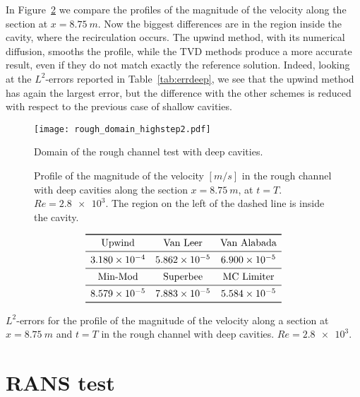 In Figure~\ref{fig:linecompdeep} we compare the profiles of the magnitude of 
the velocity along the section at $x=\SI{8.75}{m}$. Now the biggest differences 
are in the region inside the cavity, where the recirculation occurs. The upwind 
method, with its numerical diffusion, smooths the profile, while the TVD 
methods produce a more accurate result, even if they do not match exactly the 
reference solution. Indeed, looking at the $L^2$-errors reported in 
Table~\ref{tab:errdeep}, we see that the upwind method has again the largest error, 
but the difference with the other schemes is reduced with respect to the 
previous case of shallow cavities.
\begin{figure}
	\centering
	\texttt{[image: rough\_domain\_highstep2.pdf]}
	\caption[Domain of the rough channel test with deep cavities]{Domain of the 
	rough channel test with deep cavities.}
	\label{fig:roughdomdeep}
\end{figure}
\begin{figure}
	\centering
	
	\caption[Profile of the magnitude of the velocity in the rough channel with 
	deep cavities at $Re=\num{2.8e3}$]{Profile of the magnitude of the velocity 
		$[\si{m/s}]$ in the rough channel with deep cavities along the section 
		$x=\SI{8.75}{m}$, at $t=T$. $Re=\num{2.8e3}$. The region on 
		the 
		left of the dashed line is inside the cavity.}
	\label{fig:linecompdeep}
\end{figure}
\begin{table}
	\centering
	\[
	\begin{array}{ccc}
	\toprule
	\text{Upwind} & \text{Van Leer} & \text{Van Alabada}\\
	\midrule
	\num{3.180e-4} & \num{5.862e-5} & \num{6.900e-5}\\
	\midrule
	\text{Min-Mod} & \text{Superbee} & \text{MC Limiter} \\
	\midrule
	\num{8.579e-5} & \num{7.883e-5} & \num{5.584e-5}\\
	\bottomrule
	\end{array}
	\]
	\caption[$L^2$-errors for the profile of the magnitude of the velocity in 
	the rough channel with deep cavities]{$L^2$-errors for the profile of the 
	magnitude of the velocity along a section at $x=\SI{8.75}{m}$ and 
	$t=T$ in the rough channel with deep cavities. $Re = \num{2.8e3}$.}
	\label{tab:errdeep}
\end{table}
%
\section{RANS test}
